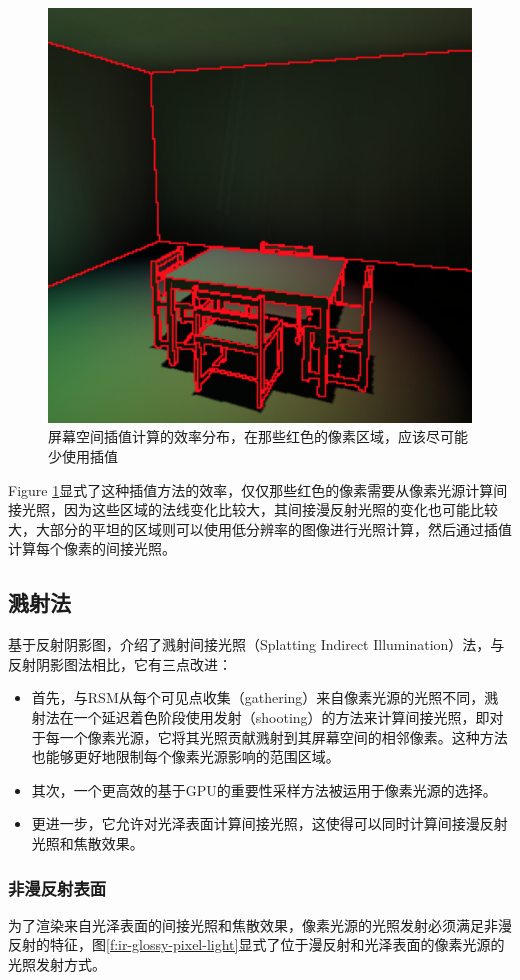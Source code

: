 \begin{figure}
\sidecaption
	\includegraphics[width=.45\textwidth]{figures/ir/ir-2-4}
	\caption{屏幕空间插值计算的效率分布，在那些红色的像素区域，应该尽可能少使用插值}
	\label{f:ir-rsm-ss-interpolation}
\end{figure} 


Figure \ref{f:ir-rsm-ss-interpolation}显式了这种插值方法的效率，仅仅那些红色的像素需要从像素光源计算间接光照，因为这些区域的法线变化比较大，其间接漫反射光照的变化也可能比较大，大部分的平坦的区域则可以使用低分辨率的图像进行光照计算，然后通过插值计算每个像素的间接光照。





\subsection{溅射法}\label{sec:ir-splatting}
基于反射阴影图，\cite{a:SplattingIndirectIllumination}介绍了溅射间接光照（Splatting Indirect Illumination）法，与反射阴影图法相比，它有三点改进：

\begin{itemize}
	\item 首先，与RSM从每个可见点收集（gathering）来自像素光源的光照不同，溅射法在一个延迟着色阶段使用发射（shooting）的方法来计算间接光照，即对于每一个像素光源，它将其光照贡献溅射到其屏幕空间的相邻像素。这种方法也能够更好地限制每个像素光源影响的范围区域。
	\item 其次，一个更高效的基于GPU的重要性采样方法被运用于像素光源的选择。
	\item 更进一步，它允许对光泽表面计算间接光照，这使得可以同时计算间接漫反射光照和焦散效果。
\end{itemize}




\subsubsection{非漫反射表面}
为了渲染来自光泽表面的间接光照和焦散效果，像素光源的光照发射必须满足非漫反射的特征，图\ref{f:ir-glossy-pixel-light}显式了位于漫反射和光泽表面的像素光源的光照发射方式。

